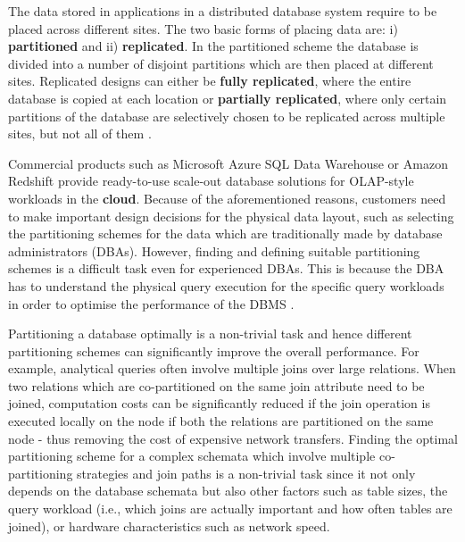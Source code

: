 The data stored in applications in a distributed database system require to be placed across different sites. The two basic forms of placing data are: i) \textbf{partitioned} and ii) \textbf{replicated}. In the partitioned scheme the database is divided into a number of disjoint partitions which are then placed at different sites. Replicated designs can either be \textbf{fully replicated}, where the entire database is copied at each location or \textbf{partially replicated}, where only certain partitions of the database are selectively chosen to be replicated across multiple sites, but not all of them \cite{ozsu2011principles}. 

Commercial products such as Microsoft Azure SQL Data Warehouse or Amazon Redshift provide ready-to-use scale-out database solutions for OLAP-style workloads in the \textbf{cloud}. Because of the aforementioned reasons, customers need to make important design decisions for the physical data layout, such as selecting the partitioning schemes for the data which are traditionally made by database administrators (DBAs). However, finding and defining suitable partitioning schemes is a difficult task even for experienced DBAs. This is because the DBA has to understand the physical query execution for the specific query workloads in order to optimise the performance of the DBMS \cite{jindal2011relax}. 

Partitioning a database optimally is a non-trivial task and hence different partitioning schemes can significantly improve the overall performance. For example, analytical queries often involve multiple joins over large relations. When two relations which are co-partitioned on the same join attribute need to be joined, computation costs can be significantly reduced if the join operation is executed locally on the node if both the relations are partitioned on the same node - thus removing the cost of expensive network transfers. Finding the optimal partitioning scheme for a complex schemata which involve multiple co-partitioning strategies and join paths is a non-trivial task since it not only depends on the database schemata but also other factors such as table sizes, the query workload (i.e., which joins are actually important and how often tables are joined), or hardware characteristics such as network speed. 

